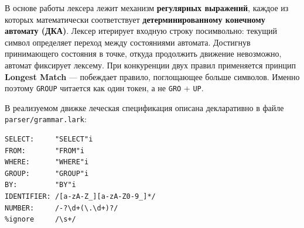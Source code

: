 \documentclass[a4paper,12pt]{report}
\begin{document}
В основе работы лексера лежит механизм \textbf{регулярных выражений}, каждое из которых математически соответствует \textbf{детерминированному конечному автомату (ДКА)}. Лексер итерирует входную строку посимвольно: текущий символ определяет переход между состояниями автомата. Достигнув принимающего состояния в точке, откуда продолжить движение невозможно, автомат фиксирует лексему. При конкуренции двух правил применяется принцип \textbf{Longest Match} — побеждает правило, поглощающее больше символов. Именно поэтому \texttt{GROUP} читается как один токен, а не \texttt{GRO} + \texttt{UP}.

В реализуемом движке леческая спецификация описана декларативно в файле \texttt{parser/grammar.lark}:

\begin{verbatim}
SELECT:     "SELECT"i
FROM:       "FROM"i
WHERE:      "WHERE"i
GROUP:      "GROUP"i
BY:         "BY"i
IDENTIFIER: /[a-zA-Z_][a-zA-Z0-9_]*/
NUMBER:     /-?\d+(\.\d+)?/
%ignore     /\s+/
\end{verbatim}
\end{document}

